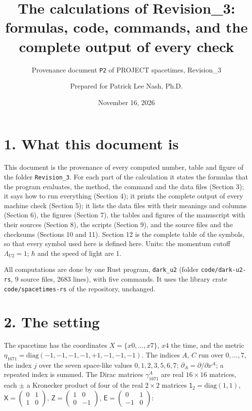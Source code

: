 \documentclass[
  10pt,
]{article}
\title{The calculations of Revision\_3: formulas, code, commands, and
the complete output of every check}
\subtitle{Provenance document \texttt{P2} of PROJECT spacetimes,
Revision\_3}
\author{Prepared for Patrick Lee Nash, Ph.D.}
\date{November 16, 2026}
\begin{document}
\maketitle

\hypertarget{what-this-document-is}{%
\section{1. What this document is}\label{what-this-document-is}}

This document is the provenance of every computed number, table and
figure of the folder \texttt{Revision\_3}. For each part of the
calculation it states the formulas that the program evaluates, the
method, the command and the data files (Section 3); it says how to run
everything (Section 4); it prints the complete output of every machine
check (Section 5); it lists the data files with their meanings and
columns (Section 6), the figures (Section 7), the tables and figures of
the manuscript with their sources (Section 8), the scripts (Section 9),
and the source files and the checksums (Sections 10 and 11). Section 12
is the complete table of the symbols, so that every symbol used here is
defined here. Units: the momentum cutoff \(\Lambda_{U2}=1\); \(\hbar\)
and the speed of light are 1.

All computations are done by one Rust program, \texttt{dark\_u2} (folder
\texttt{code/dark-u2-rs}, 9 source files, 2683 lines), with five
commands. It uses the library crate \texttt{code/spacetimes-rs} of the
repository, unchanged.

\hypertarget{the-setting}{%
\section{2. The setting}\label{the-setting}}

The spacetime has the coordinates \(X=\{x0,\dots,x7\}\), \(x4\) the
time, and the metric
\(\eta_{1671}=\mathrm{diag}(-1,-1,-1,-1,+1,-1,-1,-1)\). The indices
\(A\), \(C\) run over \(0,\dots,7\), the index \(j\) over the seven
space-like values \(0,1,2,3,5,6,7\);
\(\partial_A=\partial/\partial x^A\); a repeated index is summed. The
Dirac matrices \(\gamma^A_{1671}\) are real \(16\times16\) matrices,
each \(\pm\) a Kronecker product of four of the real \(2\times2\)
matrices \(\mathsf 1_2=\mathrm{diag}(1,1)\),
\(\mathsf X=\begin{pmatrix}0&1\\1&0\end{pmatrix}\),
\(\mathsf Z=\begin{pmatrix}1&0\\0&-1\end{pmatrix}\),
\(\mathsf E=\begin{pmatrix}0&1\\-1&0\end{pmatrix}\):
\end{document}
